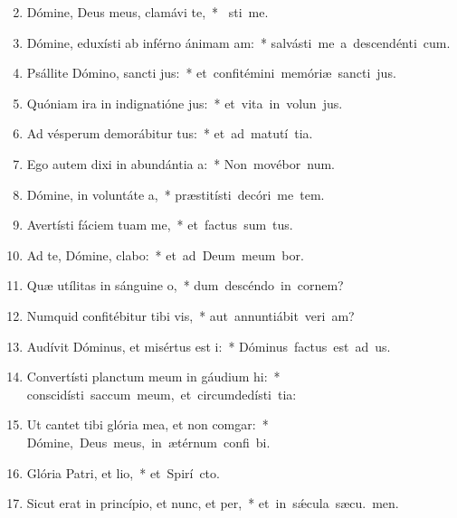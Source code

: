 \begin{flushleft}
\begin{enumerate}[leftmargin=*]
\setcounter{enumi}{1}

\item Dómine, Deus meus, clamávi  te,~* \mbox{ sti me.}
\item Dómine, eduxísti ab inférno ánimam am:~* \mbox{salvásti me a descendénti  cum.}
\item Psállite Dómino, sancti jus:~* \mbox{et confitémini memóriæ sancti jus.}
\item Quóniam ira in indignatióne jus:~* \mbox{et vita in volun jus.}
\item Ad vésperum demorábitur tus:~* \mbox{et ad matutí tia.}
\item Ego autem dixi in abundántia a:~* \mbox{Non movébor  num.}
\item Dómine, in voluntáte a,~* \mbox{præstitísti decóri me tem.}
\item Avertísti fáciem tuam  me,~* \mbox{et factus sum tus.}
\item Ad te, Dómine, clabo:~* \mbox{et ad Deum meum bor.}
\item Quæ utílitas in sánguine o,~* \mbox{dum descéndo in cornem?}
\item Numquid confitébitur tibi vis,~* \mbox{aut annuntiábit veri am?}
\item Audívit Dóminus, et misértus est i:~* \mbox{Dóminus factus est ad us.}
\item Convertísti planctum meum in gáudium hi:~* \mbox{conscidísti saccum meum, et circumdedísti  tia:}
\item Ut cantet tibi glória mea, et non comgar:~* \mbox{Dómine, Deus meus, in ætérnum confi bi.}
\item Glória Patri, et lio,~* \mbox{et Spirí cto.}
\item Sicut erat in princípio, et nunc, et per,~* \mbox{et in s\'{\ae}cula sæcu. men.}

\end{enumerate}
\end{flushleft}

